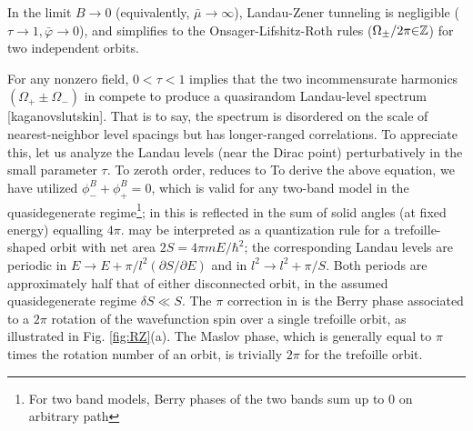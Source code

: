 \documentclass[aps, prb, showpacs, twocolumn, notitlepage, superscriptaddress]{revtex4-1}
\begin{document}
In the limit $B{\rightarrow}0$ (equivalently, $\bar{\mu}{\rightarrow} \infty$), Landau-Zener tunneling is negligible ($\tau{\rightarrow}1,\bar{\varphi}{\rightarrow}0$), and  simplifies to the Onsager-Lifshitz-Roth rules ($\Omega_{\pm}/2\pi{\in}\mathbb{Z}$) for  two independent orbits.

For any nonzero field, $0{<}\tau{<}1$ implies that the two incommensurate harmonics $(\Omega_+{\pm}\Omega_-)$ in  compete to produce a quasirandom Landau-level spectrum [kaganovslutskin]. That is to say, the spectrum is disordered on the scale of nearest-neighbor level spacings but has longer-ranged correlations. To appreciate this, let us analyze the Landau levels (near the Dirac point) perturbatively in the small parameter $\tau$. To zeroth order,  reduces to
To derive the above equation, we have utilized $\phi^B_-{+}\phi^B_+{=}0$, which is valid for any two-band model in the quasidegenerate regime\footnote{For two band models, Berry phases of the two bands sum up to 0 on arbitrary path}; in  this is reflected in the sum of solid angles (at fixed energy) equalling $4\pi$.  may be interpreted as a quantization rule for a trefoille-shaped orbit with net area $2S{=}4\pi m E{/\hbar^2}$; the corresponding Landau levels are periodic in $E{\rightarrow}E{+}\pi/l^2(\partial S/\partial E)$ and in $l^2{\rightarrow}l^2{+}\pi/S$. Both periods are approximately half that of either disconnected  orbit, in the assumed quasidegenerate regime $\delta S{\ll}S$. The $\pi$ correction in  is the Berry phase associated to a $2\pi$ rotation of the wavefunction spin over a single trefoille orbit, as illustrated in Fig. \ref{fig:RZ}(a). The Maslov phase, which is generally equal to $\pi$ times the rotation number of an orbit, is trivially $2\pi$ for the trefoille orbit.


\end{document}
